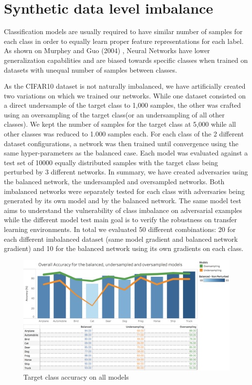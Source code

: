 \section{Synthetic data level imbalance}

Classification models are usually required to have similar number of samples for each class in order to equally learn proper feature representations for each label. As shown on Murphey and Guo (2004) \cite{murphey2004}, Neural Networks have lower generalization capabilities and are biased towards specific classes when trained on datasets with unequal number of samples between classes. 

As the CIFAR10 dataset is not naturally imbalanced, we have artificially created two variations on which we trained our networks.  While one dataset consisted on a direct undersample of the target class to 1,000 samples, the other was crafted using  an oversampling of the target class(or an undersampling of all other classes). We kept the number of samples for the target class at 5,000 while all other classes was reduced to 1.000 samples each. For each class of the 2 different dataset configurations, a network was then trained until convergence using the same hyper-parameters as the balanced case. Each model was evaluated against a test set of 10000 equally distributed samples with the target class being perturbed by 3 different networks. In summary, we have created adversaries using the balanced network, the undersampled and oversampled networks. Both imbalanced networks were separately tested for each class with adversaries being generated by its own model and by the balanced network. The same model test aims to understand the vulnerability of class imbalance on adversarial examples while the different model test main goal is to verify the robustness on transfer learning environments. In total we evaluated 50 different combinations: 20 for each different imbalanced dataset (same model gradient and balanced network gradient) and 10 for the balanced network using its own gradients on each class.

\begin{figure}[!h]
	\centering
	\includegraphics[scale=0.3]{graph_non_pert.png}
	\caption{Target class accuracy on all models}
	\label{fig:acc_graph}
\end{figure}


